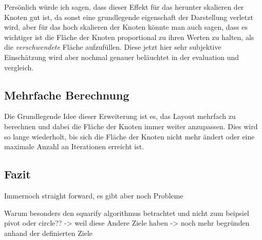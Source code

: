 Persönlich würde ich sagen, dass dieser Effekt für das herunter skalieren der Knoten gut ist, da sonst eine grundlegende eigenschaft der Darstellung verletzt wird, aber für das hoch skalieren der Knoten könnte man auch sagen, dass es wichtiger ist die Fläche der Knoten proportional zu ihren Werten zu halten, als die \textit{verschwendete} Fläche aufzufüllen. Diese jetzt hier sehr subjektive Einschätzung wird aber nochmal genauer beläuchtet in der evaluation und vergleich.

\subsection{Mehrfache Berechnung} \label{sec:MehrfacheBerechnung}
Die Grundlegende Idee dieser Erweiterung ist es, das Layout mehrfach zu berechnen und dabei die Fläche der Knoten immer weiter anzupassen. Dies wird so lange wiederholt, bis sich die Fläche der Knoten nicht mehr ändert oder eine maximale Anzahl an Iterationen erreicht ist.

\subsection{Fazit}
Immernoch straight forward, es gibt aber noch Probleme 

Warum besonders den squarify algorithmus betrachtet und nicht zum beipsiel pivot oder circle?? -> weil diese Andere Ziele haben -> noch mehr begründen anhand der definierten Ziele